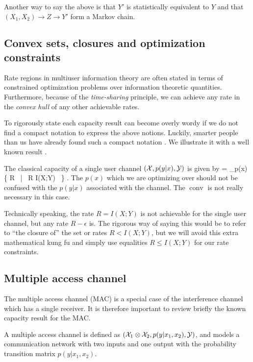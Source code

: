 \documentclass[aps,11pt,twoside,letterpaper]{article}
\begin{document}
        Another way to say the above is that $Y'$ is statistically equivalent to $Y$ and
        that $(X_1,X_2) \to Z \to Y' $ form a Markov chain.
        

    \subsection{Convex sets, closures and optimization constraints}
    	
	Rate regions in multiuser information theory are often stated in terms of constrained 
	optimization problems over information theoretic quantities.
	Furthermore, because of the \emph{time-sharing} principle, 
	we can achieve any rate in the \emph{convex hull} of any other achievable rates.
	
	To rigorously state each capacity result can become overly wordy if we do not
	find a compact notation to express the above notions.
	Luckily, smarter people than us have already found such a compact notation \cite{Sato77}.
	We illustrate it with a well known result \cite{S48}.
	
	The classical capacity of a single user channel $({\cal X},p(y|x),{\cal Y})$ is given by
	\be
		 =  \bigcup_{p(x)} \{ R  \ | \ R \leq I(X;Y) \  \} .
	\ee
	The $p(x)$ which we are optimizing over should not be confused with 
	the $p(y|x)$ associated with the channel.
	The $\operatorname{conv}$ is not really necessary in this case.
	
	Technically speaking, the rate $R = I(X;Y)$ is not achievable for the single user channel,
	but any rate $R-\epsilon$ is.
	The rigorous way of saying this would be to refer to ``the closure of'' the set or rates 
	$R < I(X;Y)$, but we will avoid this extra mathematical  kung fu and simply use equalities 
	$R \leq I(X;Y)$ for our rate constraints.


    \subsection{Multiple access channel} \label{subseciton:MAC}

        The multiple access channel (MAC) is a special case of the interference channel which has a single 
        receiver. 
        It is therefore important to review briefly the known capacity result for the MAC.

        \begin{definition}[MAC]
            A multiple access channel is defined as $({\cal X}_1 \otimes {\cal X}_2, p(y|x_1,x_2), {\cal Y})$,
            and models a communication network with two inputs and one output with 
            the probability transition matrix $p(y|x_1,x_2)$.
        \end{definition}
        
\end{document}
